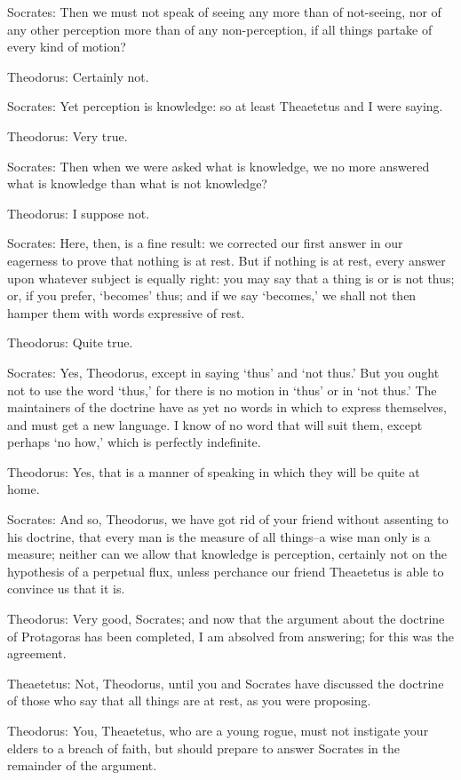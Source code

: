 Socrates: Then we must not speak of seeing any more than of not-seeing,
nor of any other perception more than of any non-perception, if all
things partake of every kind of motion?

Theodorus: Certainly not.

Socrates: Yet perception is knowledge: so at least Theaetetus and I were
saying.

Theodorus: Very true.

Socrates: Then when we were asked what is knowledge, we no more answered
what is knowledge than what is not knowledge?

Theodorus: I suppose not.

Socrates: Here, then, is a fine result: we corrected our first answer
in our eagerness to prove that nothing is at rest. But if nothing is at
rest, every answer upon whatever subject is equally right: you may say
that a thing is or is not thus; or, if you prefer, `becomes' thus; and
if we say `becomes,' we shall not then hamper them with words expressive
of rest.

Theodorus: Quite true.

Socrates: Yes, Theodorus, except in saying `thus' and `not thus.' But
you ought not to use the word `thus,' for there is no motion in `thus'
or in `not thus.' The maintainers of the doctrine have as yet no words
in which to express themselves, and must get a new language. I know of
no word that will suit them, except perhaps `no how,' which is perfectly
indefinite.

Theodorus: Yes, that is a manner of speaking in which they will be quite
at home.

Socrates: And so, Theodorus, we have got rid of your friend without
assenting to his doctrine, that every man is the measure of all
things--a wise man only is a measure; neither can we allow that
knowledge is perception, certainly not on the hypothesis of a perpetual
flux, unless perchance our friend Theaetetus is able to convince us that
it is.

Theodorus: Very good, Socrates; and now that the argument about the
doctrine of Protagoras has been completed, I am absolved from answering;
for this was the agreement.

Theaetetus: Not, Theodorus, until you and Socrates have discussed the
doctrine of those who say that all things are at rest, as you were
proposing.

Theodorus: You, Theaetetus, who are a young rogue, must not instigate
your elders to a breach of faith, but should prepare to answer Socrates
in the remainder of the argument.

